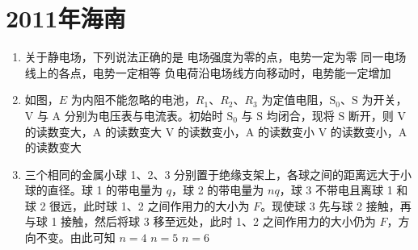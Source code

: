 \documentclass[\gkver]{gaokaozhenti}
\begin{document}
\chapter{2011年海南}

\begin{enumerate}
\item
关于静电场，下列说法正确的是
{电场强度为零的点，电势一定为零}
{同一电场线上的各点，电势一定相等}
{负电荷沿电场线方向移动时，电势能一定增加}


\item
如图，$E$ 为内阻不能忽略的电池，$R_{1}$、$R_{2}$、$R_{3}$ 为定值电阻，$\mathrm{S}_{0}$、$\mathrm{S}$ 为开关，V 与 A 分别为电压表与电流表。初始时 $\mathrm{S}_{0}$ 与 $\mathrm{S}$ 均闭合，现将 $\mathrm{S}$ 断开，则
{V 的读数变大，A 的读数变大}
{V 的读数变小，A 的读数变小}
{V 的读数变小，A 的读数变大}


\item
三个相同的金属小球 1、2、3 分别置于绝缘支架上，各球之间的距离远大于小球的直径。球 1 的带电量为 $q$，球 2 的带电量为 $nq$，球 3 不带电且离球 1 和球 2 很远，此时球 1、2 之间作用力的大小为 $F$。现使球 3 先与球 2 接触，再与球 1 接触，然后将球 3 移至远处，此时 1、2 之间作用力的大小仍为 $F$，方向不变。由此可知
{$n=4$}
{$n=5$}
{$n=6$}



\end{enumerate}
\end{document}

